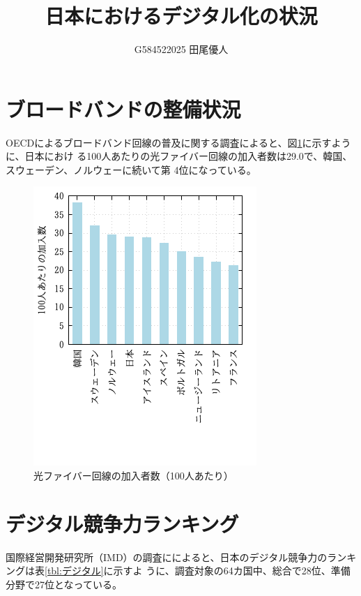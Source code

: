 \documentclass[a4paper,11pt,dvipdfmx]{ujarticle}
\title{日本におけるデジタル化の状況}
\author{G584522025 田尾優人}
\begin{document}
\maketitle %



\section{ブロードバンドの整備状況}
OECDによるブロードバンド回線の普及に関する調査\cite{oecd}によると、図\ref{fig:ランキング}に示すように、日本におけ
る100人あたりの光ファイバー回線の加入者数は29.0で、韓国、スウェーデン、ノルウェーに続いて第
4位になっている。
\begin{figure}[htbp]
    \centering
    \includegraphics{fig11.png}
    \caption{光ファイバー回線の加入者数（100人あたり）}\label{fig:ランキング}
\end{figure}

\section{デジタル競争力ランキング}
国際経営開発研究所（IMD）の調査に\cite{imd}によると、日本のデジタル競争力のランキングは表\ref{tbl:デジタル}に示すよ
うに、調査対象の64カ国中、総合で28位、準備分野で27位となっている。
\end{document}
